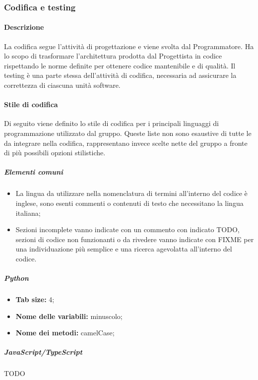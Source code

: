 \subsubsection{Codifica e testing}\label{codificatesting}
\paragraph{Descrizione}
La codifica segue l'attività di progettazione e viene svolta dal Programmatore. Ha lo scopo di trasformare l'architettura prodotta dal Progettista in codice rispettando le norme definite per ottenere codice mantenibile e di qualità. Il testing è una parte stessa dell'attività di codifica, necessaria ad assicurare la correttezza di ciascuna unità software.

\paragraph{Stile di codifica}
Di seguito viene definito lo stile di codifica per i principali linguaggi di programmazione utilizzato dal gruppo. Queste liste non sono esaustive di tutte le  da integrare nella codifica, rappresentano invece scelte nette del gruppo a fronte di più possibili opzioni stilistiche.

\subparagraph{Elementi comuni}
\begin{itemize}
  \item La lingua da utilizzare nella nomenclatura di termini all'interno del codice è inglese, sono esenti commenti o contenuti di testo che necessitano la lingua italiana;
  \item Sezioni incomplete vanno indicate con un commento con indicato TODO, sezioni di codice non funzionanti o da rivedere vanno indicate con FIXME per una individuazione più semplice e una ricerca agevolatta all'interno del codice.
\end{itemize}

\subparagraph{Python}
\begin{itemize}
  \item \textbf{Tab size:} 4;
  \item \textbf{Nome delle variabili:} minuscolo;
  \item \textbf{Nome dei metodi:} camelCase;
\end{itemize}

\subparagraph{JavaScript/TypeScript}
TODO